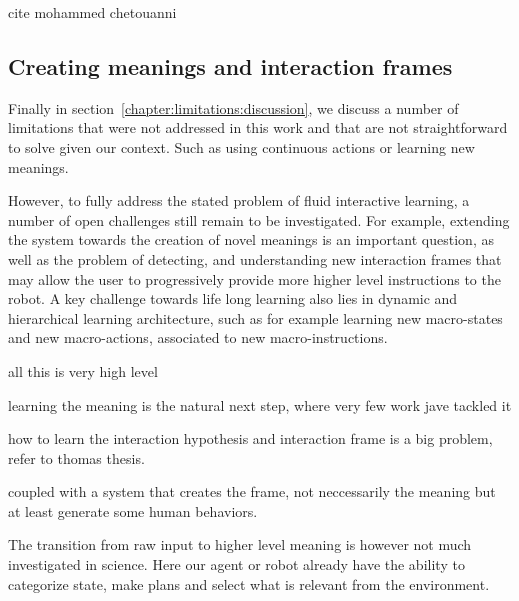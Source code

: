 cite mohammed chetouanni

\subsection{Creating meanings and interaction frames}


Finally in section~\ref{chapter:limitations:discussion}, we discuss a number of limitations that were not addressed in this work and that are not straightforward to solve given our context. Such as using continuous actions or learning new meanings.

However, to fully address the stated problem of fluid interactive learning, a number of open challenges still remain to be investigated. For example, extending the system towards the creation of novel meanings is an important question, as well as the problem of detecting, and understanding new interaction frames that may allow the user to progressively provide more higher level instructions to the robot. A key challenge towards life long learning also lies in dynamic and hierarchical learning architecture, such as for example learning new macro-states and new macro-actions, associated to new macro-instructions.

all this is very high level

learning the meaning is the natural next step, where very few work jave tackled it

how to learn the interaction hypothesis and interaction frame is a big problem, refer to thomas thesis.

coupled with a system that creates the frame, not neccessarily the meaning but at least generate some human behaviors.


The transition from raw input to higher level meaning is however not much investigated in science. Here our agent or robot already have the ability to categorize state, make plans and select what is relevant from the environment.

